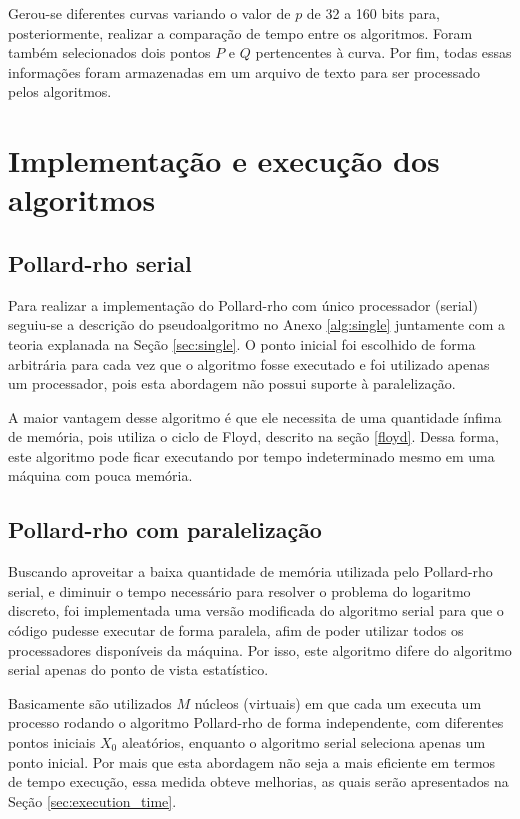 Gerou-se diferentes curvas variando o valor de \(p\) de 32 a 160 bits para, posteriormente, realizar a comparação de tempo entre os algoritmos. Foram também selecionados dois pontos \(P\) e \(Q\) pertencentes à curva. Por fim, todas essas informações foram armazenadas em um arquivo de texto para ser processado pelos algoritmos.

\section{Implementação e execução dos algoritmos}

\subsection{Pollard-rho serial}
Para realizar a implementação do Pollard-rho com único processador (serial) seguiu-se a descrição do pseudoalgoritmo no Anexo \ref{alg:single} juntamente com a teoria explanada na Seção \ref{sec:single}. O ponto inicial foi escolhido de forma arbitrária para cada vez que o algoritmo fosse executado e foi utilizado apenas um processador, pois esta abordagem não possui suporte à paralelização.

A maior vantagem desse algoritmo é que ele necessita de uma quantidade ínfima de memória, pois utiliza o ciclo de Floyd, descrito na seção \ref{floyd}. Dessa forma, este algoritmo pode ficar executando por tempo indeterminado mesmo em uma máquina com pouca memória.

\subsection{Pollard-rho com paralelização}
Buscando aproveitar a baixa quantidade de memória utilizada pelo Pollard-rho serial, e diminuir o tempo necessário para resolver o problema do logaritmo discreto, foi implementada uma versão modificada do algoritmo serial para que o código pudesse executar de forma paralela, afim de poder utilizar todos os processadores disponíveis da máquina. Por isso, este algoritmo difere do algoritmo serial apenas do ponto de vista estatístico.

Basicamente são utilizados \(M\) núcleos (virtuais) em que cada um executa um processo rodando o algoritmo Pollard-rho de forma independente, com diferentes pontos iniciais \(X_0\) aleatórios, enquanto o algoritmo serial seleciona apenas um ponto inicial. Por mais que esta abordagem não seja a mais eficiente em termos de tempo execução, essa medida obteve melhorias, as quais serão apresentados na Seção \ref{sec:execution_time}.

